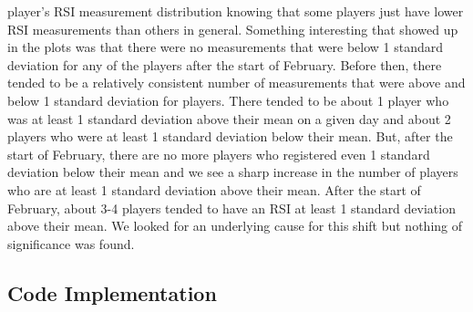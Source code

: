 \documentclass[
]{article}
\begin{document}
player's RSI measurement distribution knowing that some players just
have lower RSI measurements than others in general. Something
interesting that showed up in the plots was that there were no
measurements that were below 1 standard deviation for any of the players
after the start of February. Before then, there tended to be a
relatively consistent number of measurements that were above and below 1
standard deviation for players. There tended to be about 1 player who
was at least 1 standard deviation above their mean on a given day and
about 2 players who were at least 1 standard deviation below their mean.
But, after the start of February, there are no more players who
registered even 1 standard deviation below their mean and we see a sharp
increase in the number of players who are at least 1 standard deviation
above their mean. After the start of February, about 3-4 players tended
to have an RSI at least 1 standard deviation above their mean. We looked
for an underlying cause for this shift but nothing of significance was
found.

\subsection{Code Implementation}\label{code-implementation}
\end{document}
